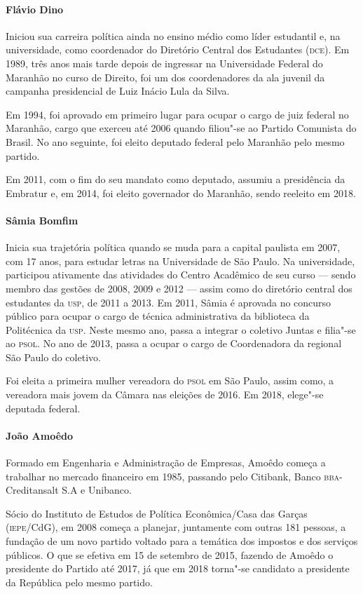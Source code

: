 \begin{bibliohedra}
\paragraph{Flávio Dino} Iniciou sua carreira política ainda no ensino médio como líder
estudantil e, na universidade, como coordenador do Diretório Central dos
Estudantes (\textsc{dce}). Em 1989, três anos mais tarde depois de ingressar na
Universidade Federal do Maranhão no curso de Direito, foi um dos
coordenadores da ala juvenil da campanha presidencial de Luiz Inácio
Lula da Silva.

Em 1994, foi aprovado em primeiro lugar para ocupar o cargo de juiz
federal no Maranhão, cargo que exerceu até 2006 quando filiou"-se ao
Partido Comunista do Brasil. No ano seguinte, foi eleito deputado
federal pelo Maranhão pelo mesmo partido.

Em 2011, com o fim do seu mandato como deputado, assumiu a presidência
da Embratur e, em 2014, foi eleito governador do Maranhão, sendo
reeleito em 2018.

\paragraph{Sâmia Bomfim} Inicia sua trajetória política quando se muda para a capital paulista em
2007, com 17 anos, para estudar letras na Universidade de São Paulo. Na
universidade, participou ativamente das atividades do Centro Acadêmico
de seu curso --- sendo membro das gestões de 2008, 2009 e 2012 --- assim
como do diretório central dos estudantes da \textsc{usp}, de 2011 a 2013. Em
2011, Sâmia é aprovada no concurso público para ocupar o cargo de
técnica administrativa da biblioteca da Politécnica da \textsc{usp}. Neste mesmo
ano, passa a integrar o coletivo Juntas e filia"-se ao \textsc{psol}. No ano de
2013, passa a ocupar o cargo de Coordenadora da regional São Paulo do
coletivo.

Foi eleita a primeira mulher vereadora do \textsc{psol} em São Paulo, assim como,
a vereadora mais jovem da Câmara nas eleições de 2016. Em 2018, elege"-se
deputada federal.

\paragraph{João Amoêdo} Formado em Engenharia e Administração de Empresas, Amoêdo começa a
trabalhar no mercado financeiro em 1985, passando pelo Citibank, Banco
\textsc{bba}-Creditansalt S.A e Unibanco.

Sócio do Instituto de Estudos de Política Econômica/Casa das Garças
(\textsc{iepe}/CdG), em 2008 começa a planejar, juntamente com outras 181
pessoas, a fundação de um novo partido voltado para a temática dos
impostos e dos serviços públicos. O que se efetiva em 15 de setembro de
2015, fazendo de Amoêdo o presidente do Partido até 2017, já que em 2018
torna"-se candidato a presidente da República pelo mesmo partido.


\end{bibliohedra}
